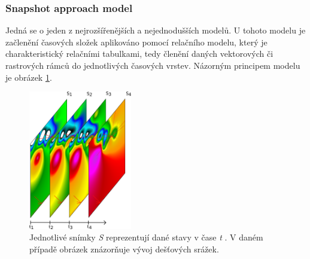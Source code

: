 \documentclass[a4paper,12pt]{article}
\begin{document}
\subsubsection{Snapshot approach model}
Jedná se o jeden z nejrozšířenějších a nejednodušších modelů. U tohoto modelu je začlenění časových složek aplikováno pomocí relačního modelu, který je charakteristický relačními tabulkami, tedy členění daných vektorových či rastrových rámců do jednotlivých časových vrstev. Názorným principem modelu je obrázek \ref{fig:snapshot}.

\begin{figure}[h!]
    \centering
    \includegraphics[width=0.4\textwidth]{./img/temporal/snapshot.png}
    \caption[Snapshot model]{Jednotlivé snímky \emph{S} reprezentují dané stavy v čase \emph{t} . V daném případě obrázek znázorňuje vývoj dešťových srážek.  \centering \footnotemark }
        \label{fig:snapshot}
 \end{figure}   
\end{document}
